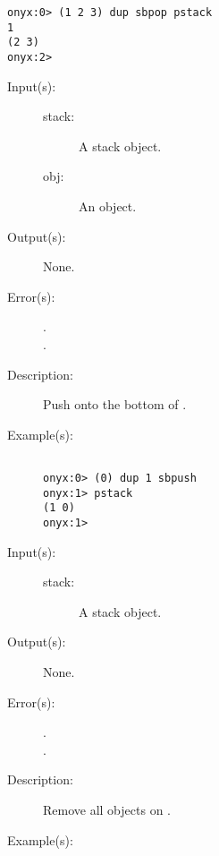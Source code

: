 \begin{description}
\begin{description}
\begin{verbatim}
onyx:0> (1 2 3) dup sbpop pstack
1
(2 3)
onyx:2>
		\end{verbatim}
	\end{description}
\label{systemdict:sbpush}
\item[{\onyxop{stack obj}{sbpush}{--}}: ]
	\begin{description}\item[]
	\item[Input(s): ]
		\begin{description}\item[]
		\item[stack: ]
			A stack object.
		\item[obj: ]
			An object.
		\end{description}
	\item[Output(s): ] None.
	\item[Error(s): ]
		\begin{description}\item[]
		\item[.]
		\item[.]
		\end{description}
	\item[Description: ]
		Push  onto the bottom of .
	\item[Example(s): ]\begin{verbatim}

onyx:0> (0) dup 1 sbpush
onyx:1> pstack
(1 0)
onyx:1>
		\end{verbatim}
	\end{description}
\label{systemdict:sclear}
\item[{\onyxop{stack}{sclear}{--}}: ]
	\begin{description}\item[]
	\item[Input(s): ]
		\begin{description}\item[]
		\item[stack: ]
			A stack object.
		\end{description}
	\item[Output(s): ] None.
	\item[Error(s): ]
		\begin{description}\item[]
		\item[.]
		\item[.]
		\end{description}
	\item[Description: ]
		Remove all objects on .
	\item[Example(s): ]\begin{verbatim}


\end{verbatim}
\end{description}
\end{description}
